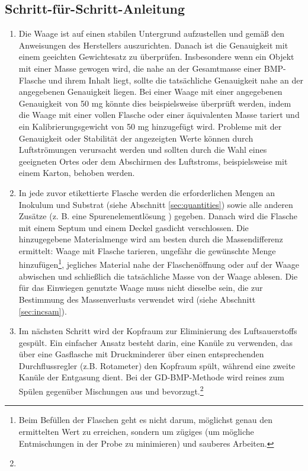 \documentclass[]{article}
\begin{document}
\subsection{Schritt-für-Schritt-Anleitung}
\begin{enumerate}
  \item Die Waage ist auf einen stabilen Untergrund aufzustellen und gemäß den Anweisungen des Herstellers auszurichten. Danach ist die Genauigkeit mit einem geeichten Gewichtesatz zu überprüfen.
      Insbesondere wenn ein Objekt mit einer Masse gewogen wird, die nahe an der Gesamtmasse einer BMP-Flasche und ihrem Inhalt liegt, sollte die tatsächliche Genauigkeit nahe an der angegebenen Genauigkeit liegen. Bei einer Waage mit einer angegebenen Genauigkeit von 50 mg könnte dies beispielsweise überprüft werden, indem die Waage mit einer vollen Flasche oder einer äquivalenten Masse tariert und ein Kalibrierungsgewicht von 50 mg hinzugefügt wird.
      Probleme mit der Genauigkeit oder Stabilität der angezeigten Werte können durch Luftströmungen verursacht werden und sollten durch die Wahl eines geeigneten Ortes oder dem Abschirmen des Luftstroms, beispielsweise mit einem Karton, behoben werden.
    \item In jede zuvor etikettierte Flasche werden die erforderlichen Mengen an Inokulum und Substrat (siehe Abschnitt \ref{sec:quantities}) sowie alle anderen Zusätze (z. B. eine Spurenelementlösung \citep{holligerStandardizationBiomethanePotential2016}) gegeben. Danach wird die Flasche mit einem Septum und einem Deckel gasdicht verschlossen.
      Die hinzugegebene Materialmenge wird am besten durch die Massendifferenz ermittelt: Waage mit Flasche tarieren, ungefähr die gewünschte Menge hinzufügen\footnote{Beim Befüllen der Flaschen geht es nicht darum, möglichst genau den ermittelten Wert zu erreichen, sondern um zügiges (um mögliche Entmischungen in der Probe zu minimieren) und sauberes Arbeiten.}, jegliches Material nahe der Flaschenöffnung oder auf der Waage abwischen und schließlich die tatsächliche Masse von der Waage ablesen.
      Die für das Einwiegen genutzte Waage muss nicht dieselbe  sein, die zur Bestimmung des Massenverlusts verwendet wird (siehe Abschnitt \ref{sec:incsam}).
    \item Im nächsten Schritt wird der Kopfraum zur Eliminierung des Luftsauerstoffs gespült.
      Ein einfacher Ansatz besteht darin, eine Kanüle zu verwenden, das über eine Gasflasche mit Druckminderer über einen entsprechenden Durchflussregler (z.B.  Rotameter) den Kopfraum spült, während eine zweite Kanüle der Entgasung dient. Bei der GD-BMP-Methode wird reines  zum Spülen gegenüber Mischungen aus  und  bevorzugt.\footnote{
}
\end{enumerate}
\end{document}
